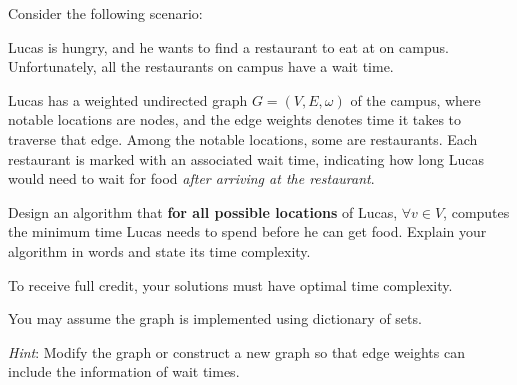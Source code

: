 \begin{prob}
    Consider the following scenario:

    Lucas is hungry, and he wants to find a restaurant to eat at on campus. Unfortunately, all the restaurants on campus have a wait time. 

    Lucas has a weighted undirected graph $G = (V, E, \omega)$ of the campus, where notable locations are nodes, and the edge weights denotes time it takes to traverse that edge. Among the notable locations, some are restaurants. Each restaurant is marked with an associated wait time, indicating how long Lucas would need to wait for food \textit{after arriving at the restaurant}. 

    Design an algorithm that  \textbf{for all possible locations} of Lucas, $\forall v \in V$, computes the minimum time Lucas needs to spend before he can get food. Explain your algorithm in words and state its time complexity. 

    To receive full credit, your solutions must have optimal time complexity. 
    
    You may assume the graph is implemented using dictionary of sets. 

    \textit{Hint}: Modify the graph or construct a new graph so that edge weights can include the information of wait times. 
    
    \begin{soln}
    \end{soln}

\end{prob}

